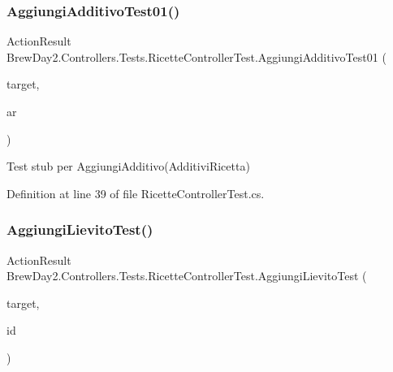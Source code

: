 \subsubsection{\texorpdfstring{Aggiungi\+Additivo\+Test01()}{AggiungiAdditivoTest01()}}
{\footnotesize\ttfamily Action\+Result Brew\+Day2.\+Controllers.\+Tests.\+Ricette\+Controller\+Test.\+Aggiungi\+Additivo\+Test01 (\begin{DoxyParamCaption}\item[{\mbox{[}\+Pex\+Assume\+Under\+Test\mbox{]} \mbox{\hyperlink{class_brew_day2_1_1_controllers_1_1_ricette_controller}{Ricette\+Controller}}}]{target,  }\item[{\mbox{\hyperlink{class_brew_day2_1_1_models_1_1_additivi_ricetta}{Additivi\+Ricetta}}}]{ar }\end{DoxyParamCaption})}



Test stub per Aggiungi\+Additivo(\+Additivi\+Ricetta)



Definition at line 39 of file Ricette\+Controller\+Test.\+cs.

\mbox{\label{class_brew_day2_1_1_controllers_1_1_tests_1_1_ricette_controller_test_ae64be8de7561f993b36ae13bc310ac04}} 
\subsubsection{\texorpdfstring{Aggiungi\+Lievito\+Test()}{AggiungiLievitoTest()}}
{\footnotesize\ttfamily Action\+Result Brew\+Day2.\+Controllers.\+Tests.\+Ricette\+Controller\+Test.\+Aggiungi\+Lievito\+Test (\begin{DoxyParamCaption}\item[{\mbox{[}\+Pex\+Assume\+Under\+Test\mbox{]} \mbox{\hyperlink{class_brew_day2_1_1_controllers_1_1_ricette_controller}{Ricette\+Controller}}}]{target,  }\item[{int}]{id }\end{DoxyParamCaption})}



